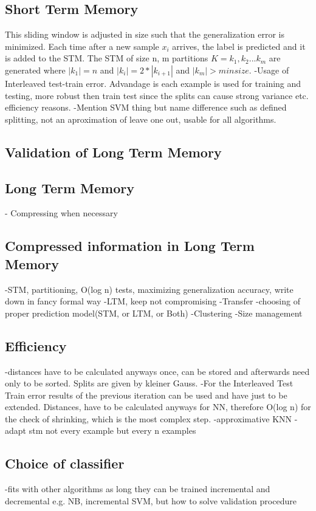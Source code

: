 \documentclass[conference]{IEEEtran}
\begin{document}
\subsection{Short Term Memory}
This sliding window is adjusted in size such that the generalization error is minimized. 
Each time after a new sample $x_i$ arrives, the label is predicted and it is added to the STM.
The STM of size n, m partitions $K ={k_1, k_2...k_m} $ are generated where $|k_1| = n$ and $|k_i| = 2*|k_{i+1}|$ and $|k_m| > minsize$.  
-Usage of Interleaved test-train error. Advandage is each example is used for training and testing, more robust then train test since the splits can cause strong variance etc.
efficiency reasons.
-Mention SVM thing but name difference such as defined splitting, not an aproximation of leave one out, usable for all algorithms. 
\subsection{Validation of Long Term Memory}

\subsection{Long Term Memory}
- Compressing when necessary

\subsection{Compressed information in Long Term Memory}

-STM, partitioning, O(log n) tests, maximizing generalization accuracy, write down in fancy formal way
-LTM, keep not compromising
-Transfer
-choosing of proper prediction model(STM, or LTM, or Both)
-Clustering
-Size management

\subsection{Efficiency}
-distances have to be calculated anyways once, can be stored and afterwards need only to be sorted. Splits are given by kleiner Gauss.
-For the Interleaved Test Train error results of the previous iteration can be used and have just to be extended. Distances, have to be calculated anyways for NN,
therefore O(log n) for the check of shrinking, which is the most complex step.
-approximative KNN
-adapt stm not every example but every n examples

\subsection{Choice of classifier}
-fits with other algorithms as long they can be trained incremental and decremental e.g. NB, incremental SVM, but how to solve validation procedure
\end{document}
